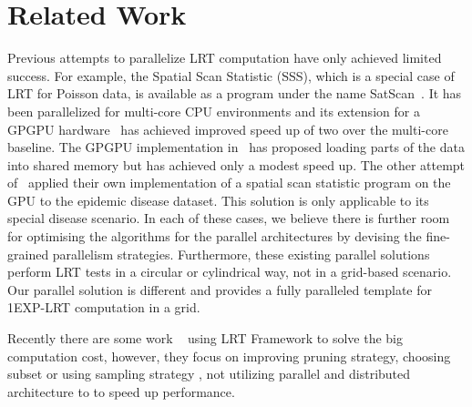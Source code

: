 \documentclass[AMA,LATO1COL]{WileyNJD-v2}
\begin{document}
\section {Related Work} \label{RW}
Previous attempts to parallelize LRT computation have only achieved limited success. For example, the Spatial Scan Statistic (SSS), which
is a special case of LRT for Poisson data, is available
as a program under the name SatScan~\cite{sat}. It has been parallelized for multi-core CPU environments and its extension for a GPGPU hardware~\cite{Larew} has
achieved improved speed up of two over the multi-core
baseline. The GPGPU implementation in~\cite{Larew} has proposed loading parts
of the data into shared memory but has achieved only a modest speed up. The
other attempt of~\cite{zhao} applied their own implementation of a spatial
scan statistic program on the GPU to the epidemic disease dataset. This solution is only applicable to its special disease scenario.
In each of these cases, we believe there is further room for optimising the
algorithms for the parallel architectures by devising the fine-grained parallelism strategies. Furthermore, these existing parallel solutions perform
LRT tests in a circular or cylindrical way, not in a grid-based scenario. Our parallel
solution is different and provides a fully paralleled template for
1EXP-LRT computation in a grid.

Recently there are some work ~\cite{Power,Neil16,xzhou16,Matheny16} using LRT Framework  to solve the big computation cost, however, they focus on improving pruning strategy, choosing subset or using sampling strategy , not utilizing parallel and distributed architecture to to speed up performance.
\end{document}
